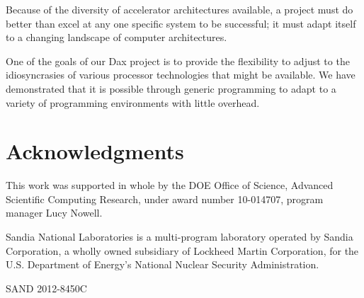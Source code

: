 \documentclass[conference]{IEEEtran}
\begin{document}
Because of the diversity of accelerator architectures available, a project
must do better than excel at any one specific system to be successful; it
must adapt itself to a changing landscape of computer architectures.

One of the goals of our Dax project is to provide the flexibility to adjust
to the idiosyncrasies of various processor technologies that might be
available.  We have demonstrated that it is possible through generic
programming to adapt to a variety of programming environments with little
overhead.

\section*{Acknowledgments}

\noindent
This work was supported in whole by the DOE Office of Science, Advanced
Scientific Computing Research, under award number 10-014707, program
manager Lucy Nowell.

Sandia National Laboratories is a multi-program laboratory operated by
Sandia Corporation, a wholly owned subsidiary of Lockheed Martin
Corporation, for the U.S. Department of Energy's National Nuclear Security
Administration.

\noindent
{\small SAND 2012-8450C}



\end{document}
